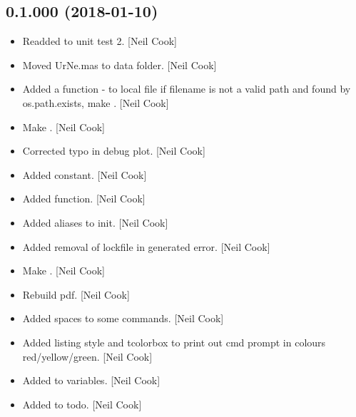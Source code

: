 \documentclass[a4paper,10pt,english]{report}
\begin{document}
\subsection{0.1.000 (2018-01-10)}
\label{\detokenize{misc/changelog:id503}}\begin{itemize}
\item {} 
Readded  to unit test 2. {[}Neil Cook{]}

\item {} 
Moved UrNe.mas to data folder. {[}Neil Cook{]}

\item {} 
Added a  function - to local file if filename is not a
valid path and found by os.path.exists, make  .
{[}Neil Cook{]}

\item {} 
Make  . {[}Neil Cook{]}

\item {} 
Corrected typo in debug plot. {[}Neil Cook{]}

\item {} 
Added  constant. {[}Neil Cook{]}

\item {} 
Added  function. {[}Neil Cook{]}

\item {} 
Added aliases to init. {[}Neil Cook{]}

\item {} 
Added removal of lockfile in generated error. {[}Neil Cook{]}

\item {} 
Make  . {[}Neil Cook{]}

\item {} 
Rebuild pdf. {[}Neil Cook{]}

\item {} 
Added spaces to some commands. {[}Neil Cook{]}

\item {} 
Added listing style and tcolorbox to print out cmd prompt in colours
red/yellow/green. {[}Neil Cook{]}

\item {} 
Added to variables. {[}Neil Cook{]}

\item {} 
Added to todo. {[}Neil Cook{]}


\end{itemize}
\end{document}
